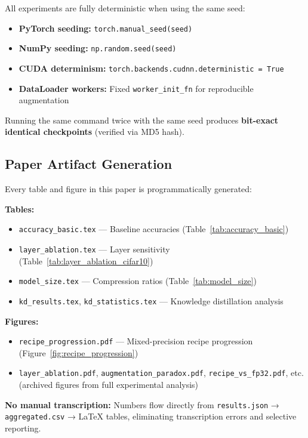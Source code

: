 All experiments are fully deterministic when using the same seed:

\begin{itemize}
    \item \textbf{PyTorch seeding:} \texttt{torch.manual\_seed(seed)}
    \item \textbf{NumPy seeding:} \texttt{np.random.seed(seed)}
    \item \textbf{CUDA determinism:} \texttt{torch.backends.cudnn.deterministic = True}
    \item \textbf{DataLoader workers:} Fixed \texttt{worker\_init\_fn} for reproducible augmentation
\end{itemize}

Running the same command twice with the same seed produces \textbf{bit-exact identical checkpoints} (verified via MD5 hash).

\subsection{Paper Artifact Generation}

Every table and figure in this paper is programmatically generated:

\textbf{Tables:}
\begin{itemize}
    \item \texttt{accuracy\_basic.tex} — Baseline accuracies (Table~\ref{tab:accuracy_basic})
    \item \texttt{layer\_ablation.tex} — Layer sensitivity (Table~\ref{tab:layer_ablation_cifar10})
    \item \texttt{model\_size.tex} — Compression ratios (Table~\ref{tab:model_size})
    \item \texttt{kd\_results.tex}, \texttt{kd\_statistics.tex} — Knowledge distillation analysis
\end{itemize}

\textbf{Figures:}
\begin{itemize}
    \item \texttt{recipe\_progression.pdf} — Mixed-precision recipe progression (Figure~\ref{fig:recipe_progression})
    \item \texttt{layer\_ablation.pdf}, \texttt{augmentation\_paradox.pdf}, \texttt{recipe\_vs\_fp32.pdf}, etc. (archived figures from full experimental analysis)
\end{itemize}

\textbf{No manual transcription:} Numbers flow directly from \texttt{results.json} → \texttt{aggregated.csv} → LaTeX tables, eliminating transcription errors and selective reporting.

